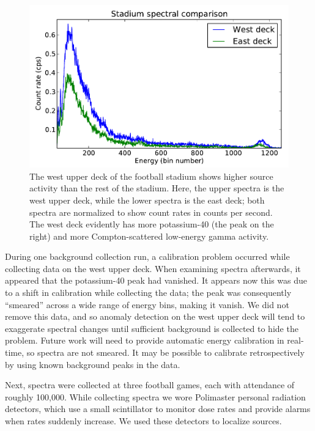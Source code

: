 \begin{figure}
  \centering
  \includegraphics[width=\textwidth]{figures/stadium-concrete.pdf}
  \caption{The west upper deck of the football stadium shows higher source
    activity than the rest of the stadium. Here, the upper spectra is the west
    upper deck, while the lower spectra is the east deck; both spectra are
    normalized to show count rates in counts per second. The west deck evidently
    has more potassium-40 (the peak on the right) and more Compton-scattered
    low-energy gamma activity.}
  \label{stadium-concrete}
\end{figure}

During one background collection run, a calibration problem occurred while
collecting data on the west upper deck. When examining spectra afterwards, it
appeared that the potassium-40 peak had vanished. It appears now this was due to
a shift in calibration while collecting the data; the peak was consequently
``smeared'' across a wide range of energy bins, making it vanish. We did not
remove this data, and so anomaly detection on the west upper deck will tend to
exaggerate spectral changes until sufficient background is collected to hide the
problem. Future work will need to provide automatic energy calibration in
real-time, so spectra are not smeared. It may be possible to calibrate
retrospectively by using known background peaks in the data.

Next, spectra were collected at three football games, each with attendance of
roughly 100,000. While collecting spectra we wore Polimaster personal radiation
detectors, which use a small scintillator to monitor dose rates and provide
alarms when rates suddenly increase. We used these detectors to localize
sources.

